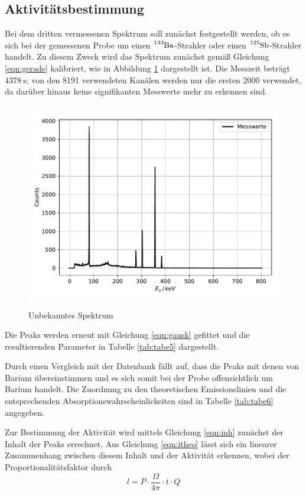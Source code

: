 \subsection{Aktivitätsbestimmung}
Bei dem dritten vermessenen Spektrum soll zunächst festgestellt werden, ob es sich bei der gemessenen
Probe um einen $\ce{^{133}Ba}$-Strahler oder einen $\ce{^{125}Sb}$-Strahler handelt. Zu diesem
Zweck wird das Spektrum zunächst gemäß Gleichung \ref{eqn:gerade} kalibriert, wie in Abbildung
\ref{fig:plot7} dargestellt ist. Die Messzeit beträgt $\SI{4378}{\second}$; von den 8191 verwendeten
Kanälen werden nur die ersten 2000 verwendet, da darüber hinaus keine signifikanten
Messwerte mehr zu erkennen sind.
\begin{figure}
  \centering
  \includegraphics[height=9cm]{Ba.pdf}
  \caption{Unbekanntes Spektrum}
  \label{fig:plot7}
\end{figure}
Die Peaks werden erneut mit Gleichung \ref{eqn:gausk} gefittet und die resultierenden
Parameter in Tabelle \ref{tab:tabe5} dargestellt.

Durch einen Vergleich mit der Datenbank
\cite{Lara} fällt auf, dass die Peaks mit denen von Barium übereinstimmen und es sich somit
bei der Probe offensichtlich um Barium handelt. Die Zuordnung zu den theoretischen Emissionslinien
und die entsprechenden Absorptionswahrscheinlickeiten sind in Tabelle \ref{tab:tabe6} angegeben.

Zur Bestimmung der Aktivität wird mittels Gleichung \ref{eqn:inh} zunächst der Inhalt der Peaks errechnet.
Aus Gleichung \ref{eqn:itheo} lässt sich ein linearer Zusammenhang zwischen diesem Inhalt und der Aktivität
erkennen, wobei der Proportionalitätsfaktor durch
\begin{equation}
  l = P\cdot \frac{\Omega}{4\pi}\cdot t \cdot Q
  \label{eqn:lin}
\end{equation}
